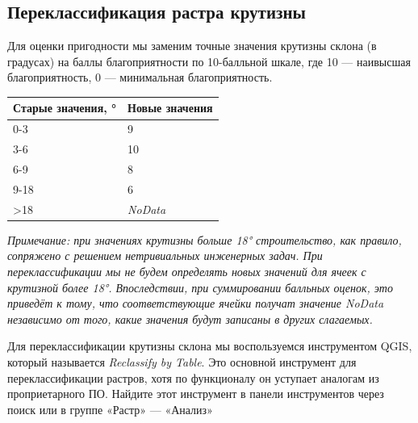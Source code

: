 \documentclass[
  12pt,
]{book}
\begin{document}
\hypertarget{weighted-overlay-reclass-slope}{%
\subsection{Переклассификация растра крутизны}\label{weighted-overlay-reclass-slope}}

Для оценки пригодности мы заменим точные значения крутизны склона (в градусах) на баллы благоприятности по 10-балльной шкале, где 10 --- наивысшая благоприятность, 0 --- минимальная благоприятность.

\begin{longtable}[]{@{}ll@{}}
\toprule
Старые значения, ° & Новые значения \\
\midrule
\endhead
0-3 & 9 \\
3-6 & 10 \\
6-9 & 8 \\
9-18 & 6 \\
\textgreater18 & \emph{NoData} \\
\bottomrule
\end{longtable}

\emph{Примечание: при значениях крутизны больше 18° строительство, как правило, сопряжено с решением нетривиальных инженерных задач. При переклассификации мы не будем определять новых значений для ячеек с крутизной более 18°. Впоследствии, при суммировании балльных оценок, это приведёт к тому, что соответствующие ячейки получат значение NoData независимо от того, какие значения будут записаны в других слагаемых.}

Для переклассификации крутизны склона мы воспользуемся инструментом QGIS, который называется \emph{Reclassify by Table}. Это основной инструмент для переклассификации растров, хотя по функционалу он уступает аналогам из проприетарного ПО. Найдите этот инструмент в панели инструментов через поиск или в группе «Растр» --- «Анализ»
\end{document}
